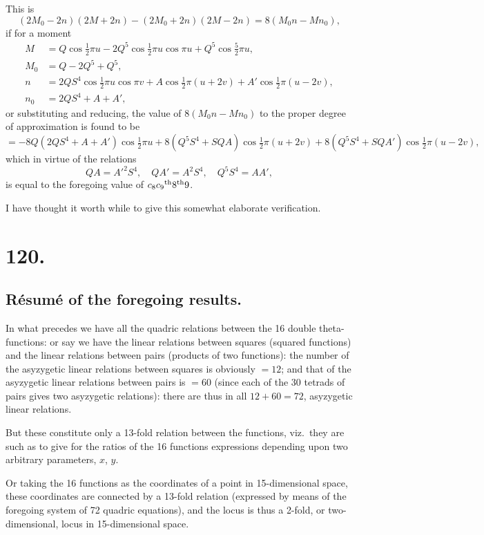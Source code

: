 \documentclass[11pt,a4paper]{book}
\providecommand{\uth}{\textsuperscript{th}}
\begin{document}
This is
\[
(2M_0 - 2n)(2M + 2n) - (2M_0 + 2n)(2M - 2n) = 8(M_0n - Mn_0),
\]
if for a moment
\begin{align*}
M &= Q\cos\tfrac{1}{2}\pi u - 2Q^5\cos\tfrac{1}{2}\pi u\cos\pi u + Q^5\cos\tfrac{5}{2}\pi u, \\
M_0 &= Q - 2Q^5 + Q^5, \\
n &= 2QS^4\cos\tfrac{1}{2}\pi u\cos\pi v + A\cos\tfrac{1}{2}\pi(u+2v) + A'\cos\tfrac{1}{2}\pi(u-2v), \\
n_0 &= 2QS^4 + A + A',
\end{align*}
or substituting and reducing, the value of $8(M_0n - Mn_0)$ to the proper degree of approximation is found to be
\[
= -8Q(2QS^4 + A + A')\cos\tfrac{1}{2}\pi u + 8(Q^5S^4 + SQA)\cos\tfrac{1}{2}\pi(u+2v) + 8(Q^5S^4 + SQA')\cos\tfrac{1}{2}\pi(u-2v),
\]
which in virtue of the relations
\[
QA = A'^2S^4, \quad QA' = A^2S^4, \quad Q^5S^4 = AA',
\]
is equal to the foregoing value of $c_8c_9\uth{8}\uth{9}$.

I have thought it worth while to give this somewhat elaborate verification.

\newpage
\section*{120.}
\label{sec:120}

\subsection*{R\'{e}sum\'{e} of the foregoing results.}

In what precedes we have all the quadric relations between the 16 double theta-functions: or say we have the linear relations between squares (squared functions) and the linear relations between pairs (products of two functions): the number of the asyzygetic linear relations between squares is obviously $= 12$; and that of the asyzygetic linear relations between pairs is $= 60$ (since each of the 30 tetrads of pairs gives two asyzygetic relations): there are thus in all $12 + 60 = 72$, asyzygetic linear relations.

But these constitute only a 13-fold relation between the functions, viz.\ they are such as to give for the ratios of the 16 functions expressions depending upon two arbitrary parameters, $x$, $y$.

Or taking the 16 functions as the coordinates of a point in 15-dimensional space, these coordinates are connected by a 13-fold relation (expressed by means of the foregoing system of 72 quadric equations), and the locus is thus a 2-fold, or two-dimensional, locus in 15-dimensional space.
\end{document}
